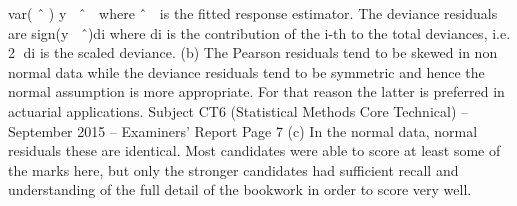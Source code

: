 var( ˆ )
y ˆ

where ˆ  is the fitted response
estimator.
The deviance residuals are sign(y ˆ)di where di is the contribution of
the i-th to the total deviances,
i.e. 2
di is the scaled deviance.
(b) The Pearson residuals tend to be skewed in non normal data
while the deviance residuals tend to be symmetric and hence the
normal assumption is more appropriate.
For that reason the latter is preferred in actuarial applications.
Subject CT6 (Statistical Methods Core Technical) – September 2015 – Examiners’ Report
Page 7
(c) In the normal data, normal residuals these are identical.
Most candidates were able to score at least some of the marks here, but only
the stronger candidates had sufficient recall and understanding of the full
detail of the bookwork in order to score very well.
